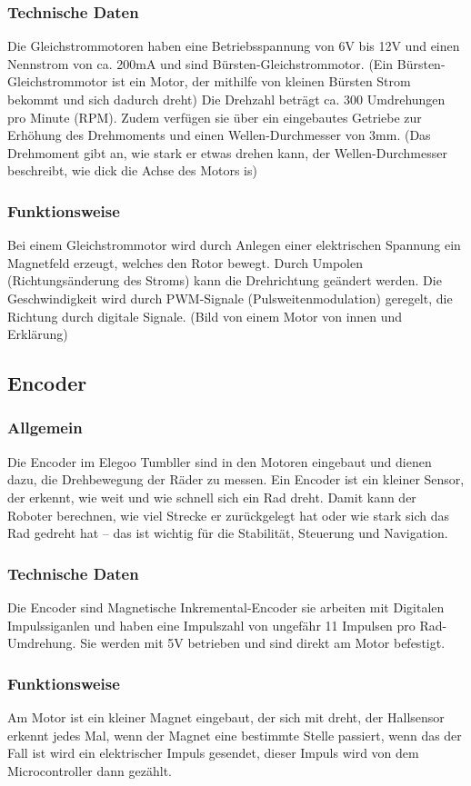 \subsubsection{Technische Daten}
Die Gleichstrommotoren haben eine Betriebsspannung von 6V bis 12V und einen Nennstrom von ca. 200mA und sind Bürsten-Gleichstrommotor. 
(Ein Bürsten-Gleichstrommotor ist ein Motor, der mithilfe von kleinen Bürsten Strom bekommt und sich dadurch dreht) Die Drehzahl beträgt ca. 300 Umdrehungen pro Minute (RPM). 
Zudem verfügen sie über ein eingebautes Getriebe zur Erhöhung des Drehmoments und einen Wellen-Durchmesser von 3mm. 
(Das Drehmoment gibt an, wie stark er etwas drehen kann, der Wellen-Durchmesser beschreibt, wie dick die Achse des Motors is)
\subsubsection{Funktionsweise}
Bei einem Gleichstrommotor wird durch Anlegen einer elektrischen Spannung ein Magnetfeld erzeugt, welches den Rotor bewegt. 
Durch Umpolen (Richtungsänderung des Stroms) kann die Drehrichtung geändert werden. 
Die Geschwindigkeit wird durch PWM-Signale (Pulsweitenmodulation) geregelt, die Richtung durch digitale Signale.
(Bild von einem Motor von innen und Erklärung)
%
\subsection{Encoder}
%
\subsubsection{Allgemein}
Die Encoder im Elegoo Tumbller sind in den Motoren eingebaut und dienen dazu, die Drehbewegung der Räder zu messen.
Ein Encoder ist ein kleiner Sensor, der erkennt, wie weit und wie schnell sich ein Rad dreht. 
Damit kann der Roboter berechnen, wie viel Strecke er zurückgelegt hat oder wie stark sich das Rad gedreht hat – das ist wichtig für die Stabilität, Steuerung und Navigation.
\subsubsection{Technische Daten}
Die Encoder sind Magnetische Inkremental-Encoder sie arbeiten mit Digitalen Impulssiganlen und haben eine Impulszahl von ungefähr 11 Impulsen pro Rad-Umdrehung. 
Sie werden mit 5V betrieben und sind direkt am Motor befestigt. 
\subsubsection{Funktionsweise}
Am Motor ist ein kleiner Magnet eingebaut, der sich mit dreht, der Hallsensor erkennt jedes Mal, wenn der Magnet eine bestimmte Stelle passiert, 
wenn das der Fall ist wird ein elektrischer Impuls gesendet, dieser Impuls wird von dem Microcontroller dann gezählt.
